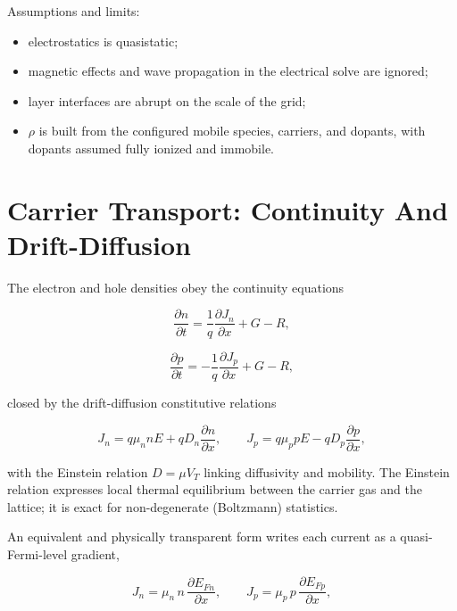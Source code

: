 \documentclass[
  11pt,
  american,
]{report}
\providecommand{\tightlist}{%
  \setlength{\itemsep}{0pt}\setlength{\parskip}{0pt}}
\begin{document}
Assumptions and limits:

\begin{itemize}
\tightlist
\item
  electrostatics is quasistatic;
\item
  magnetic effects and wave propagation in the electrical solve are
  ignored;
\item
  layer interfaces are abrupt on the scale of the grid;
\item
  \(\rho\) is built from the configured mobile species, carriers, and
  dopants, with dopants assumed fully ionized and immobile.
\end{itemize}

\hypertarget{carrier-transport-continuity-and-drift-diffusion}{%
\section{Carrier Transport: Continuity And
Drift-Diffusion}\label{carrier-transport-continuity-and-drift-diffusion}}

The electron and hole densities obey the continuity equations

\begin{equation}
\label{eq:electron-continuity}
\frac{\partial n}{\partial t}
=
\frac{1}{q}\frac{\partial J_n}{\partial x}
+G-R ,
\end{equation}

\begin{equation}
\label{eq:hole-continuity}
\frac{\partial p}{\partial t}
=
-\frac{1}{q}\frac{\partial J_p}{\partial x}
+G-R ,
\end{equation}

closed by the drift-diffusion constitutive relations

\begin{equation}
\label{eq:dd-currents}
J_n = q\mu_n n E + qD_n\frac{\partial n}{\partial x},
\qquad
J_p = q\mu_p p E - qD_p\frac{\partial p}{\partial x},
\end{equation}

with the Einstein relation \(D = \mu V_T\) linking diffusivity and
mobility. The Einstein relation expresses local thermal equilibrium
between the carrier gas and the lattice; it is exact for non-degenerate
(Boltzmann) statistics.

An equivalent and physically transparent form writes each current as a
quasi-Fermi-level gradient,

\begin{equation}
\label{eq:qfl-currents}
J_n = \mu_n\, n\, \frac{\partial E_{Fn}}{\partial x},
\qquad
J_p = \mu_p\, p\, \frac{\partial E_{Fp}}{\partial x},
\end{equation}
\end{document}
